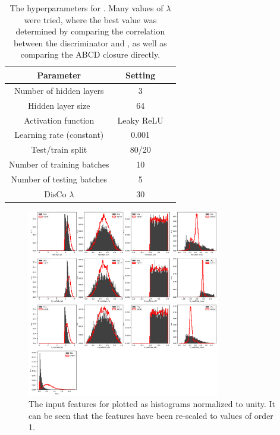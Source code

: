 \begin{table}[htbp]
    \centering
    \caption[\ABCDNet hyperparameters]{
        The hyperparameters for \ABCDNet. 
        Many values of $\lambda$ were tried, where the best value was determined by comparing the correlation between the \ABCDNet discriminator and \detajj, as well as comparing the ABCD closure directly. 
    }
    \begin{tabular}{ccc}
    \toprule
    Parameter & Setting \\
    \midrule
    Number of hidden layers    & 3          \\
    Hidden layer size          & 64         \\
    Activation function        & Leaky ReLU \\
    Learning rate (constant)   & 0.001      \\
    Test/train split           & 80/20      \\
    Number of training batches & 10         \\
    Number of testing batches  & 5          \\
    DisCo $\lambda$            & 30         \\
    \bottomrule
    \end{tabular}
    \label{tab:vbsvvh_abcdnet_params}
\end{table}

\begin{figure}[htb]
    \centering
    \includegraphics[width=0.75\textwidth]{fig/vbsvvh/all_features.pdf}
    \caption[The input features for \ABCDNet plotted as histograms normalized to unity]{
        The input features for \ABCDNet plotted as histograms normalized to unity. 
        It can be seen that the features have been re-scaled to values of order 1.
    }
    \label{fig:vbsvvh_abcdnet_inputs}
\end{figure}

